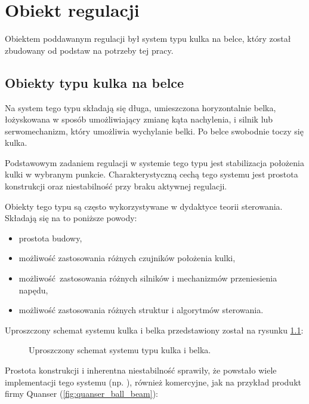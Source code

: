 \chapter{Obiekt regulacji}
\label{cha:ch2_obiekt_regulacji}

Obiektem poddawanym regulacji był system typu kulka na belce, który został zbudowany od podstaw na potrzeby tej pracy.

\section{Obiekty typu kulka na belce}

Na system tego typu składają się długa, umieszczona horyzontalnie belka, łożyskowana w sposób umożliwiający zmianę kąta nachylenia, i silnik lub serwomechanizm, który umożliwia wychylanie belki.
Po belce swobodnie toczy się kulka.

Podstawowym zadaniem regulacji w systemie tego typu jest stabilizacja położenia kulki w wybranym punkcie.
Charakterystyczną cechą tego systemu jest prostota konstrukcji oraz niestabilność przy braku aktywnej regulacji.

Obiekty tego typu są często wykorzystywane w dydaktyce teorii sterowania. Składają się na to poniższe powody:

\begin{itemize}
	\item prostota budowy,
	\item możliwość zastosowania różnych czujników położenia kulki,
	\item możliwość zastosowania różnych silników i mechanizmów przeniesienia napędu,
    \item możliwość zastosowania różnych struktur i algorytmów sterowania.
\end{itemize}

Uproszczony schemat systemu kulka i belka przedstawiony został na rysunku \ref{fig:schemat_uproszczony}:

\begin{figure}[H]
	\centering
    
	\caption{Uproszczony schemat systemu typu kulka i belka.}
	\label{fig:schemat_uproszczony}
\end{figure}

Prostota konstrukcji i inherentna niestabilność sprawiły, że powstało wiele implementacji tego systemu (np. \cite{BABEX1}\cite{BABEX2}\cite{BABEX3}), również komercyjne, jak na przykład produkt firmy Quanser (\cref{fig:quanser_ball_beam}):

